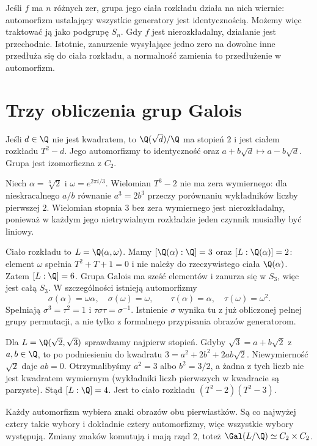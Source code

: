 Jeśli $f$ ma $n$ różnych zer, grupa jego ciała rozkładu działa na nich wiernie: automorfizm ustalający wszystkie generatory jest identycznością. Możemy więc traktować ją jako podgrupę $S_n$. Gdy $f$ jest nierozkładalny, działanie jest przechodnie. Istotnie, zanurzenie wysyłające jedno zero na dowolne inne przedłuża się do ciała rozkładu, a normalność zamienia to przedłużenie w automorfizm.

\section{Trzy obliczenia grup Galois}

\begin{przyklad}
Jeśli $d\in\Q$ nie jest kwadratem, to $\Q(\sqrt d)/\Q$ ma stopień $2$ i jest ciałem rozkładu $T^2-d$. Jego automorfizmy to identyczność oraz $a+b\sqrt d\mapsto a-b\sqrt d$. Grupa jest izomorficzna z $C_2$.
\end{przyklad}

\begin{przyklad}
Niech $\alpha=\sqrt[3]{2}$ i $\omega=e^{2\pi i/3}$. Wielomian $T^3-2$ nie ma zera wymiernego: dla nieskracalnego $a/b$ równanie $a^3=2b^3$ przeczy porównaniu wykładników liczby pierwszej $2$. Wielomian stopnia $3$ bez zera wymiernego jest nierozkładalny, ponieważ w każdym jego nietrywialnym rozkładzie jeden czynnik musiałby być liniowy.

Ciało rozkładu to $L=\Q(\alpha,\omega)$. Mamy $[\Q(\alpha):\Q]=3$ oraz $[L:\Q(\alpha)]=2$: element $\omega$ spełnia $T^2+T+1=0$ i nie należy do rzeczywistego ciała $\Q(\alpha)$. Zatem $[L:\Q]=6$. Grupa Galois ma sześć elementów i zanurza się w $S_3$, więc jest całą $S_3$. W szczególności istnieją automorfizmy
\[
\sigma(\alpha)=\omega\alpha,\quad\sigma(\omega)=\omega,
\qquad\tau(\alpha)=\alpha,\quad\tau(\omega)=\omega^2.
\]
Spełniają $\sigma^3=\tau^2=1$ i $\tau\sigma\tau=\sigma^{-1}$. Istnienie $\sigma$ wynika tu z już obliczonej pełnej grupy permutacji, a nie tylko z formalnego przypisania obrazów generatorom.
\end{przyklad}

\begin{przyklad}
Dla $L=\Q(\sqrt2,\sqrt3)$ sprawdzamy najpierw stopień. Gdyby $\sqrt3=a+b\sqrt2$ z $a,b\in\Q$, to po podniesieniu do kwadratu $3=a^2+2b^2+2ab\sqrt2$. Niewymierność $\sqrt2$ daje $ab=0$. Otrzymalibyśmy $a^2=3$ albo $b^2=3/2$, a żadna z tych liczb nie jest kwadratem wymiernym (wykładniki liczb pierwszych w kwadracie są parzyste). Stąd $[L:\Q]=4$. Jest to ciało rozkładu $(T^2-2)(T^2-3)$.

Każdy automorfizm wybiera znaki obrazów obu pierwiastków. Są co najwyżej cztery takie wybory i dokładnie cztery automorfizmy, więc wszystkie wybory występują. Zmiany znaków komutują i mają rząd $2$, toteż $\Gal(L/\Q)\simeq C_2\times C_2$.
\end{przyklad}


